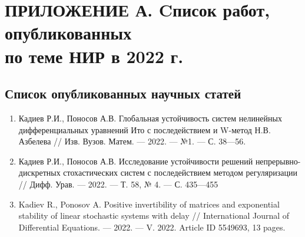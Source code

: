 \chapter{ПРИЛОЖЕНИЕ А. Cписок работ, опубликованных \texorpdfstring{\\ }{} по теме НИР в 2022 г.}


\section*{Список опубликованных научных статей}

\begin{enumerate}[1]





    \item
    Кадиев Р.И., Поносов А.В.
    Глобальная устойчивость систем нелинейных дифференциальных уравнений Ито с последействием и W-метод Н.В. Азбелева
    //
    Изв. Вузов. Матем.
    --- 2022.
    --- №1.
    --- С. 38---56.

    \item
    Кадиев Р.И., Поносов А.В.
    Исследование устойчивости решений непрерывно-дискретных стохастических систем с последействием методом регуляризации
    //
    Дифф. Урав.
    --- 2022.
    --- Т. 58, № 4.
    --- С. 435---455

    \item
    Kadiev R., Ponosov A.
    Positive invertibility of matrices and exponential stability of linear stochastic systems with delay
    //
    International Journal of Differential Equations.
    --- 2022.
    --- V. 2022.
    Article ID 5549693, 13 pages.


\end{enumerate}
